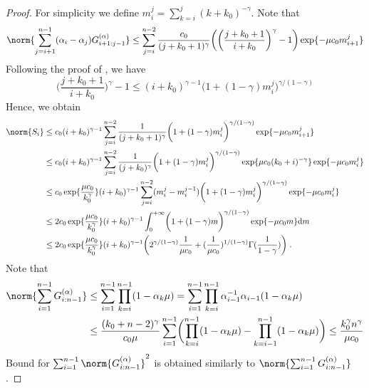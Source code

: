 \begin{proof}
For simplicity we define $m_i^j = \sum_{k=i}^j (k+k_0)^{-\gamma}$.
Note that 
\begin{equation}
    \norm{\sum_{j=i+1}^{n-1} (\alpha_i - \alpha_j) G_{i+1:j-1}^{(\alpha)}} \leq \sum_{j=i}^{n-2} \frac{c_0}{(j+k_0+1)^\gamma}\biggl(\biggl(\frac{j+k_0+1}{i+k_0}\biggr)^\gamma - 1\biggr) \exp\{-\mu c_0m_{i+1}^{j}\}
\end{equation}
    Following the proof of \cite[Lemma A.5]{wu2024statistical}, we have 
    \begin{equation}
        \biggl(\frac{j+k_0+1}{i+k_0}\biggr)^\gamma - 1 \leq (i+k_0)^{\gamma-1}\biggl(1+ (1-\gamma)m_{i}^{j}\biggr)^{\gamma/(1-\gamma)}
    \end{equation}
    Hence, we obtain 
    \begin{align}
        \norm{S_i} &\leq c_0(i+k_0)^{\gamma-1}\sum_{j=i}^{n-2} \frac{1}{(j+k_0+1)^\gamma}\biggl(1+ (1-\gamma)m_{i}^{j}\biggr)^{\gamma/(1-\gamma)} \exp\{-\mu c_0m_{i+1}^{j}\}\\ &\leq
        c_0(i+k_0)^{\gamma-1}\sum_{j=i}^{n-2} \frac{1}{(j+k_0)^\gamma}\biggl(1+ (1-\gamma)m_{i}^{j}\biggr)^{\gamma/(1-\gamma)}\exp\{\mu c_0(k_0+i)^{-\gamma}\} \exp\{-\mu c_0m_{i}^{j}\}\\&\leq 
         c_0\exp\{\frac{\mu c_0}{k_0^{\gamma}}\}(i+k_0)^{\gamma-1}\sum_{j=i}^{n-2} (m_i^j-m_i^{j-1})\biggl(1+ (1-\gamma)m_{i}^{j}\biggr)^{\gamma/(1-\gamma)} \exp\{-\mu c_0m_{i}^{j}\}\\ &\leq 
         2c_0\exp\{\frac{\mu c_0}{k_0^{\gamma}}\}(i+k_0)^{\gamma-1}\int_{0}^{+\infty}\biggl(1+ (1-\gamma)m\biggr)^{\gamma/(1-\gamma)} \exp\{-\mu c_0m\}\rmd m \\ &\leq 
         2c_0\exp\{\frac{\mu c_0}{k_0^{\gamma}}\}(i+k_0)^{\gamma-1}\biggl(2^{\gamma/(1-\gamma)}\frac{1}{\mu c_0} + (\frac{1}{\mu c_0})^{1/(1-\gamma)}\Gamma(\frac{1}{1-\gamma})\biggr)\eqsp.
    \end{align}
    Note that 
\begin{align}
    \norm{\sum_{i=1}^{n-1}G_{i:n-1}^{(\alpha)}}&\leq \sum_{i=1}^{n-1}\prod_{k=i}^{n-1}(1-\alpha_k\mu) = \sum_{i=1}^{n-1}\prod_{k=i}^{n-1}\alpha_{i-1}^{-1}\alpha_{i-1}(1-\alpha_k\mu) \\&\leq\frac{(k_0+n-2)^\gamma}{c_0\mu}\sum_{i=1}^{n-1}\biggl(\prod_{k=i}^{n-1}(1-\alpha_k\mu)-\prod_{k=i-1}^{n-1}(1-\alpha_k\mu)\biggr)\leq \frac{k_0^{\gamma}n^{\gamma}}{\mu c_0}
\end{align}
    Bound for $\sum_{i=1}^{n-1}\norm{G_{i:n-1}^{(\alpha)}}^2$ is obtained similarly to $ \norm{\sum_{i=1}^{n-1}G_{i:n-1}^{(\alpha)}}$.
\end{proof}

